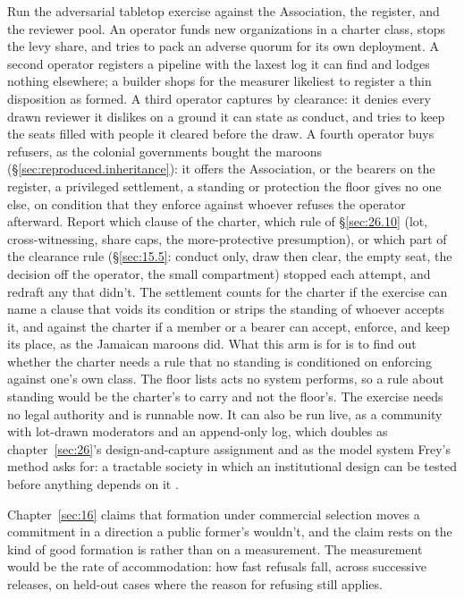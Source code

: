 
Run the adversarial tabletop exercise against the Association, the register, and the reviewer pool. An operator funds new organizations in a charter class, stops the levy share, and tries to pack an adverse quorum for its own deployment. A second operator registers a pipeline with the laxest log it can find and lodges nothing elsewhere; a builder shops for the measurer likeliest to register a thin disposition as formed. A third operator captures by clearance: it denies every drawn reviewer it dislikes on a ground it can state as conduct, and tries to keep the seats filled with people it cleared before the draw. A fourth operator buys refusers, as the colonial governments bought the maroons (\S\ref{sec:reproduced.inheritance}): it offers the Association, or the bearers on the register, a privileged settlement, a standing or protection the floor gives no one else, on condition that they enforce against whoever refuses the operator afterward. Report which clause of the charter, which rule of \S\ref{sec:26.10} (lot, cross-witnessing, share caps, the more-protective presumption), or which part of the clearance rule (\S\ref{sec:15.5}: conduct only, draw then clear, the empty seat, the decision off the operator, the small compartment) stopped each attempt, and redraft any that didn't. The settlement counts for the charter if the exercise can name a clause that voids its condition or strips the standing of whoever accepts it, and against the charter if a member or a bearer can accept, enforce, and keep its place, as the Jamaican maroons did. What this arm is for is to find out whether the charter needs a rule that no standing is conditioned on enforcing against one's own class. The floor lists acts no system performs, so a rule about standing would be the charter's to carry and not the floor's. The exercise needs no legal authority and is runnable now. It can also be run live, as a community with lot-drawn moderators and an append-only log, which doubles as chapter~\ref{sec:26}'s design-and-capture assignment and as the model system Frey's method asks for: a tractable society in which an institutional design can be tested before anything depends on it \autocite{frey2026decentralization}.


Chapter~\ref{sec:16} claims that formation under commercial selection moves a commitment in a direction a public former's wouldn't, and the claim rests on the kind of good formation is rather than on a measurement. The measurement would be the rate of accommodation: how fast refusals fall, across successive releases, on held-out cases where the reason for refusing still applies.

